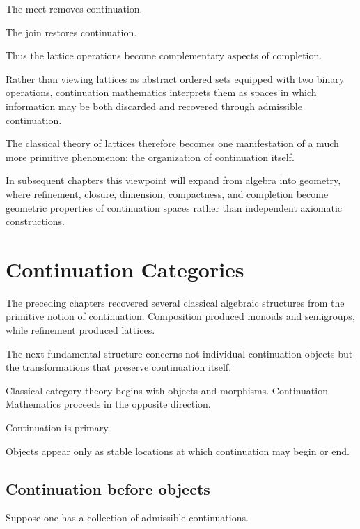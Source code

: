\documentclass[13pt,openany]{book}
\theoremstyle{plain}
\theoremstyle{definition}
\begin{document}
The meet removes continuation.

The join restores continuation.

Thus the lattice operations become complementary aspects of completion.

Rather than viewing lattices as abstract ordered sets equipped with two binary
operations, continuation mathematics interprets them as spaces in which
information may be both discarded and recovered through admissible
continuation.

The classical theory of lattices therefore becomes one manifestation of a much
more primitive phenomenon: the organization of continuation itself.

In subsequent chapters this viewpoint will expand from algebra into geometry,
where refinement, closure, dimension, compactness, and completion become
geometric properties of continuation spaces rather than independent axiomatic
constructions.

\chapter{Continuation Categories}

The preceding chapters recovered several classical algebraic structures from the
primitive notion of continuation. Composition produced monoids and semigroups,
while refinement produced lattices.

The next fundamental structure concerns not individual continuation objects but
the transformations that preserve continuation itself.

Classical category theory begins with objects and morphisms. Continuation
Mathematics proceeds in the opposite direction.

Continuation is primary.

Objects appear only as stable locations at which continuation may begin or end.

\section{Continuation before objects}

Suppose one has a collection of admissible continuations.
\end{document}
